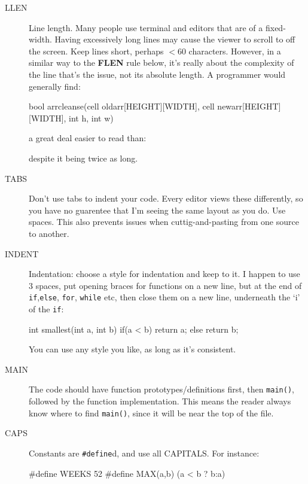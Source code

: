 \begin{description}

\item[LLEN] Line length. Many people use terminal and editors that are
of a fixed-width. Having excessively long lines may cause the viewer to scroll to
off the screen. Keep lines short, perhaps $< 60$ characters. However, in a similar way
to the {\bf FLEN} rule below, it's really about the complexity of the line that's the issue,
not its absolute length. A programmer would generally find:
{\small
\begin{codesnippet}
bool arrcleanse(cell oldarr[HEIGHT][WIDTH], cell newarr[HEIGHT][WIDTH], int h, int w)
\end{codesnippet}
}
a great deal easier to read than:
\begin{codesnippet}
if(a < b && j++ >= szpar(e ? true : false) || h==4){
\end{codesnippet}
despite it being twice as long.

\item[TABS] Don't use tabs to indent your code. Every editor views these differently, so you have no guarentee that I'm seeing the same layout as you do. Use spaces. This also prevents issues when cuttig-and-pasting from one source to another.

\item[INDENT] Indentation: choose a style for indentation
and keep to it. I happen to use $3$ spaces, put opening braces
for functions on a new line, but at the end of \verb^if^,\verb^else^, \verb^for^, \verb^while^ etc, then close them on a new line, underneath the `i' of the \verb^if^:
\begin{codesnippet}
int smallest(int a, int b)
{
   if(a < b){
      return a;
   }
   else{
      return b;
   }
}
\end{codesnippet}
You can use any style you like, as long as it's consistent.

\item[MAIN] The code should have function prototypes/definitions first, then \verb^main()^, followed by the function implementation. This means the reader always know where to find \verb^main()^, since it will be near the top of the file.


\item[CAPS] Constants are \verb^#define^d, and use all CAPITALS. For instance:
\begin{codesnippet}
#define WEEKS 52
#define MAX(a,b) (a < b ? b:a)
\end{codesnippet}



\end{description}
